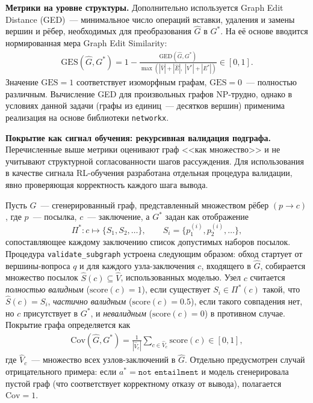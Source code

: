 \textbf{Метрики на уровне структуры.} Дополнительно используется Graph Edit Distance (GED)~--- минимальное число операций вставки, удаления и замены вершин и рёбер, необходимых для преобразования $\hat{G}$ в $G^*$. На её основе вводится нормированная мера Graph Edit Similarity:
\begin{align}
    \mathrm{GES}(\hat{G}, G^*) = 1 - \frac{\mathrm{GED}(\hat{G}, G^*)}{\max(|\hat{V}| + |\hat{E}|,\; |V^*| + |E^*|)} \in [0, 1].
    \label{eq:ges}
\end{align}
Значение $\mathrm{GES} = 1$ соответствует изоморфным графам, $\mathrm{GES} = 0$~--- полностью различным. Вычисление GED для произвольных графов NP-трудно, однако в условиях данной задачи (графы из единиц~--- десятков вершин) применима реализация на основе библиотеки \texttt{networkx}.

\textbf{Покрытие как сигнал обучения: рекурсивная валидация подграфа.} Перечисленные выше метрики оценивают граф <<как множество>> и не учитывают структурной согласованности шагов рассуждения. Для использования в качестве сигнала RL-обучения разработана отдельная процедура валидации, явно проверяющая корректность каждого шага вывода.

Пусть $\hat{G}$~--- сгенерированный граф, представленный множеством рёбер $(p \rightarrow c)$, где $p$~--- посылка, $c$~--- заключение, а $G^*$ задан как отображение
\[
\Pi^* : c \mapsto \{S_1, S_2, \ldots\}, \qquad S_i = \{p^{(i)}_1, p^{(i)}_2, \ldots\},
\]
сопоставляющее каждому заключению список допустимых наборов посылок. Процедура \texttt{validate\_subgraph} устроена следующим образом: обход стартует от вершины-вопроса $q$ и для каждого узла-заключения $c$, входящего в $\hat{G}$, собирается множество посылок $\hat{S}(c) \subseteq \hat{V}$, использованных моделью. Узел $c$ считается \emph{полностью валидным} ($\mathrm{score}(c) = 1$), если существует $S_i \in \Pi^*(c)$ такой, что $\hat{S}(c) = S_i$, \emph{частично валидным} ($\mathrm{score}(c) = 0{.}5$), если такого совпадения нет, но $c$ присутствует в $G^*$, и \emph{невалидным} ($\mathrm{score}(c) = 0$) в противном случае. Покрытие графа определяется как
\begin{align}
    \mathrm{Cov}(\hat{G}, G^*) = \frac{1}{|\hat{V}_c|} \sum_{c \in \hat{V}_c} \mathrm{score}(c) \in [0, 1],
    \label{eq:coverage}
\end{align}
где $\hat{V}_c$~--- множество всех узлов-заключений в $\hat{G}$. Отдельно предусмотрен случай отрицательного примера: если $a^* = \texttt{not entailment}$ и модель сгенерировала пустой граф (что соответствует корректному отказу от вывода), полагается $\mathrm{Cov} = 1$.

